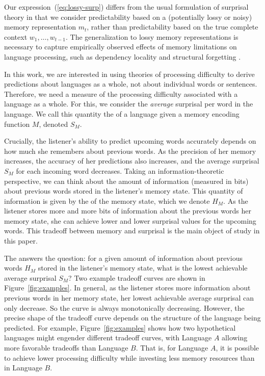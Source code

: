 Our expression~(\ref{eq:lossy-surp}) differs from the usual formulation of surprisal theory in that we consider predictability based on a (potentially lossy or noisy) memory representation $m_t$, rather than predictability based on the true complete context $w_1, \dots, w_{t-1}$. The generalization to lossy memory representations is necessary to capture empirically observed effects of memory limitations on language processing, such as dependency locality and structural forgetting \citep{futrell2020lossy}. 

In this work, we are interested in using theories of processing difficulty to derive predictions about languages as a whole, not about individual words or sentences. Therefore, we need a measure of the processing difficulty associated with a language as a whole. For this, we consider the \emph{average} surprisal per word in the language. We call this quantity the  of a language given a memory encoding function $M$, denoted $S_M$.

Crucially, the listener's ability to predict upcoming words accurately depends on how much she remembers about previous words. As the precision of her memory increases, the accuracy of her predictions also increases, and the average surprisal $S_M$ for each incoming word decreases. Taking an information-theoretic perspective, we can think about the amount of information (measured in bits) about previous words stored in the listener's memory state. This quantity of information is given by the  of the memory state, which we denote $H_M$. As the listener stores more and more bits of information about the previous words her memory state, she can achieve lower and lower surprisal values for the upcoming words. This tradeoff between memory and surprisal is the main object of study in this paper.

The  answers the question: 
for a given amount of information about previous words $H_M$ stored in the listener's memory state, what is the lowest achievable average surprisal $S_M$? Two example tradeoff curves are shown in Figure~\ref{fig:examples}. In general, as the listener stores more information about previous words in her memory state, her lowest achievable average surprisal can only decrease. So the curve is always monotonically decreasing. However, the precise shape of the tradeoff curve depends on the structure of the language being predicted. For example, Figure~\ref{fig:examples} shows how two hypothetical languages might engender different tradeoff curves, with Language $A$ allowing more favorable tradeoffs than Language $B$. That is, for Language $A$, it is possible to achieve lower processing difficulty while investing less memory resources than in Language $B$.

